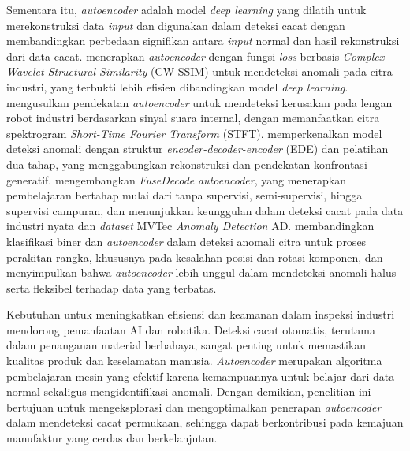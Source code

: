 Sementara itu, \textit{autoencoder} adalah model \textit{deep learning}
yang dilatih untuk merekonstruksi data \textit{input} dan digunakan
dalam deteksi cacat dengan membandingkan perbedaan signifikan antara
\textit{input} normal dan hasil rekonstruksi dari data cacat.
\citet{14} menerapkan \textit{autoencoder} dengan
fungsi \textit{loss} berbasis \textit{Complex Wavelet Structural
Similarity} (CW-SSIM)
untuk mendeteksi anomali pada citra industri, yang terbukti lebih
efisien dibandingkan model \textit{deep learning}. \citet{15}
mengusulkan pendekatan \textit{autoencoder} untuk mendeteksi kerusakan
pada lengan robot industri berdasarkan sinyal suara internal, dengan
memanfaatkan citra spektrogram \textit{Short-Time Fourier Transform}
(STFT). \citet{16} memperkenalkan model
deteksi anomali dengan struktur \textit{encoder-decoder-encoder}
(EDE) dan pelatihan dua tahap, yang
menggabungkan rekonstruksi dan pendekatan konfrontasi generatif.
\citet{17} mengembangkan \textit{FuseDecode} \textit{autoencoder}, yang
menerapkan pembelajaran bertahap mulai dari tanpa supervisi,
semi-supervisi, hingga supervisi campuran, dan menunjukkan keunggulan
dalam deteksi cacat pada data industri nyata dan \textit{dataset}
MVTec \textit{Anomaly Detection} AD. \citet{18} membandingkan
klasifikasi biner dan \textit{autoencoder} dalam deteksi anomali
citra untuk proses perakitan rangka, khususnya pada kesalahan posisi
dan rotasi komponen, dan menyimpulkan bahwa \textit{autoencoder}
lebih unggul dalam mendeteksi anomali halus serta fleksibel terhadap
data yang terbatas.

Kebutuhan untuk meningkatkan efisiensi dan keamanan dalam inspeksi
industri mendorong pemanfaatan AI dan robotika. Deteksi cacat
otomatis, terutama dalam penanganan material berbahaya, sangat
penting untuk memastikan kualitas produk dan keselamatan manusia.
\textit{Autoencoder} merupakan algoritma pembelajaran mesin yang
efektif karena kemampuannya untuk belajar dari data normal sekaligus
mengidentifikasi anomali.
Dengan demikian, penelitian ini bertujuan untuk mengeksplorasi dan
mengoptimalkan penerapan \textit{autoencoder} dalam mendeteksi cacat
permukaan, sehingga dapat berkontribusi pada kemajuan manufaktur yang
cerdas dan berkelanjutan.

\vspace{1em}

